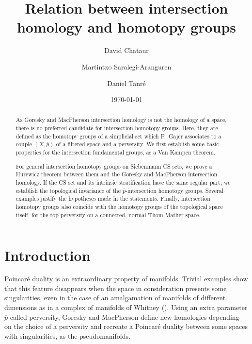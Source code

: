 \documentclass[a4paper,10pt,english,reqno]{amsart}
\title[Intersection homology and homotopy groups]{Relation between intersection homology and homotopy groups}
\date{\today}
\author{David Chataur}
\author{Martintxo Saralegi-Aranguren}
\author{Daniel Tanr\'e}
\theoremstyle{plain}
\theoremstyle{definition}
\theoremstyle{remark}
\numberwithin{equation}{section}
\def\ov{\overline}
\renewcommand\1{\hbox{\ding{192}}}
\renewcommand\2{\hbox{\ding{193}}}
\newcommand\3{\hbox{\ding{194}}}
\newcommand\4{\hbox{\ding{195}}}
\begin{document}
 
\begin{abstract} 
As Goresky and MacPherson intersection homology is not  the homology of a space, there is
no preferred candidate for intersection homotopy groups.
Here, they are defined as  the homotopy groups of a simplicial set  which P.~Gajer 
associates to a couple $(X,\ov{p})$ of a filtered space and a perversity.
We first establish some basic properties  for the intersection fundamental groups, as a Van Kampen theorem.
%


For general intersection homotopy groups on  Siebenmann CS sets, 
we prove a Hurewicz theorem between them and the Goresky and MacPherson intersection homology.
If the CS set  and its intrinsic stratification have the same regular part,
we establish the topological invariance of the $\overline{p}$-intersection homotopy groups.
Several examples justify the hypotheses made in the statements.
Finally, intersection homotopy groups also coincide with the homotopy groups of the 
topological space itself, for the top perversity  on a connected, normal Thom-Mather space. 
%
\end{abstract}


\maketitle


%


\section*{Introduction}

Poincar\'e duality is an extraordinary property of manifolds. Trivial examples show that this feature disappears
when the space in consideration presents some singularities, even in the case of an amalgamation of manifolds
of different dimensions as in a complex of manifolds of Whitney (\cite{MR19306}). 
Using an extra parameter $\ov{p}$ called perversity, Goresky and MacPherson \cite{GM1,GM2} 
define  new homologies depending on the choice of a perversity  and recreate a 
Poincar\'e duality between some spaces with singularities, as the pseudomanifolds.
\end{document}
